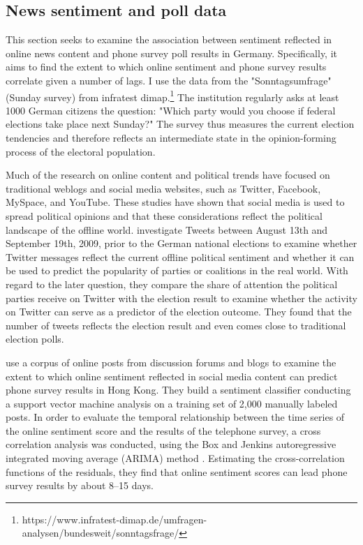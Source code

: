 \documentclass[12pt,a4paper,notitlepage]{article}
\begin{document}
\subsection{News sentiment and poll data}\label{ch_correlation}

This section seeks to examine the association between sentiment reflected in online news content and phone survey poll results in Germany. Specifically, it aims to find the extent to which online sentiment and phone survey results correlate given a number of lags. I use the data from the "Sonntagsumfrage" (Sunday survey) from infratest dimap.\footnote{https://www.infratest-dimap.de/umfragen-analysen/bundesweit/sonntagsfrage/} The institution regularly asks at least 1000 German citizens the question: "Which party would you choose if federal elections take place next Sunday?" The survey thus measures the current election tendencies and therefore reflects an intermediate state in the opinion-forming process of the electoral population.

Much of the research on online content and political trends have focused on traditional weblogs and social media websites, such as Twitter, Facebook, MySpace, and YouTube. These studies have shown that social media is used to spread political opinions and that these considerations reflect the political landscape of the offline world. \citet{tumasjan_predicting_2010} investigate Tweets between August 13th and September 19th, 2009, prior to the German national elections to examine whether Twitter messages reflect the current offline political sentiment and whether it can be used to predict the popularity of parties or coalitions in the real world. With regard to the later question, they compare the share of attention the political parties receive on Twitter with the election result to examine whether the activity on Twitter can serve as a predictor of the election outcome. They found that the number of tweets reflects the election result and even comes close to traditional election polls.

\citet{fu_analyzing_2013} use a corpus of online posts from discussion forums and blogs to examine the extent to which online sentiment reflected in social media content can predict phone survey results in Hong Kong. They build a sentiment classifier conducting a support vector machine analysis on a training set of 2,000 manually labeled posts. In order to evaluate the temporal relationship between the time series of the online sentiment score and the results of the telephone survey, a cross correlation analysis was conducted, using the Box and Jenkins autoregressive integrated moving average (ARIMA) method \citep{box_time_2008}. Estimating the cross-correlation functions of the residuals, they find that online sentiment scores can lead phone survey results by about 8–15 days. 
\end{document}
